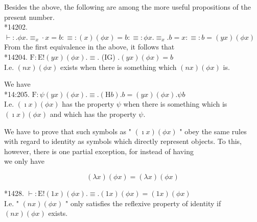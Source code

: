 \documentclass[10pt]{article}
\begin{document}
Besides the above, the following are among the more useful propositions of the present number.\\
*14202. $\vdash: . \phi x . \equiv_{x} \cdot x=b: \equiv:(x)(\phi x)=b: \equiv: \phi x . \equiv_{x} . b=x: \equiv: b=(y x)(\phi x)$\\
From the first equivalence in the above, it follows that\\
*14204. $\mathrm{F}: \mathrm{E}!(y x)(\phi x) . \equiv$. (IG) $.(y x)(\phi x)=b$\\
I.e. $(n x)(\phi x)$ exists when there is something which $(n x)(\phi x)$ is.

We have\\
*14:205. $\mathrm{F}: \psi(y x)(\phi x) . \equiv .(\mathrm{H} b) . b=(y x)(\phi x) . \psi b$\\
I.e. $(\imath x)(\phi x)$ has the property $\psi$ when there is something which is $(\imath x)(\phi x)$ and which has the property $\psi$.

We have to prove that such symbols as " $(\imath x)(\phi x)$ " obey the same rules with regard to identity as symbols which directly represent objects. To this, however, there is one partial exception, for instead of having\\
we only have

$$
(\lambda x)(\phi x)=(\lambda x)(\phi x)
$$

*1428. $\vdash: \mathrm{E}!(1 x)(\phi x) . \equiv .(1 x)(\phi x)=(1 x)(\phi x)$\\
I.e. " $(n x)(\phi x)$ " only satisfies the reflexive property of identity if $(n x)(\phi x)$ exists.
\end{document}
